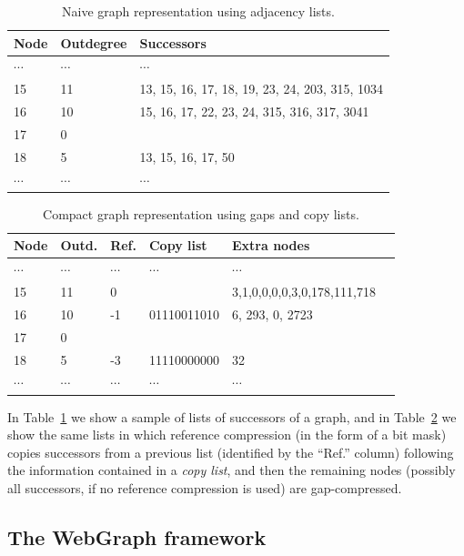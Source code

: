 \begin{table}
  \centering
  \caption{Naive graph representation using adjacency lists.}%
  \label{tab:compression-naive}
  \begin{tabular}{|l|l|l|}
    \hline
    \textbf{Node} & \textbf{Outdegree} & \textbf{Successors} \\
    \hline
    $\cdots$ & $\cdots$ & $\cdots$\\
    15 & 11 & 13, 15, 16, 17, 18, 19, 23, 24, 203, 315, 1034\\
    16 & 10 & 15, 16, 17, 22, 23, 24, 315, 316, 317, 3041\\
    17 & 0 & \\
    18 & 5 & 13, 15, 16, 17, 50\\
    $\cdots$ & $\cdots$ & $\cdots$
  \end{tabular}
\end{table}

\begin{table}
  \centering
  \caption{Compact graph representation using gaps and copy lists.}%
  \label{tab:compression-copy}
  \begin{tabular}{|l|l|l|l|l|l}
    \hline
    \textbf{Node}
    & \textbf{Outd.}
    & \textbf{Ref.}
    & \textbf{Copy list}
    & \textbf{Extra nodes}
    \\
    \hline
    $\cdots$ & $\cdots$ & $\cdots$ & $\cdots$ & $\cdots$ \\
    15 & 11 & 0 & & 3,1,0,0,0,0,3,0,178,111,718 \\
    16 & 10 & -1 & 01110011010 & 6, 293, 0, 2723 \\
    17 & 0 & & & \\
    18 & 5  & -3 & 11110000000 & 32 \\
    $\cdots$ & $\cdots$ & $\cdots$ & $\cdots$ & $\cdots$  
  \end{tabular}
\end{table}

In Table~\ref{tab:compression-naive} we show a sample of lists of successors of
a graph, and in Table~\ref{tab:compression-copy} we show the same lists in
which reference compression (in the form of a bit mask) copies successors from
a previous list (identified by the ``Ref.'' column) following the information
contained in a \emph{copy list}, and then the remaining nodes (possibly all
successors, if no reference compression is used) are gap-compressed.

\subsection{The WebGraph framework}

